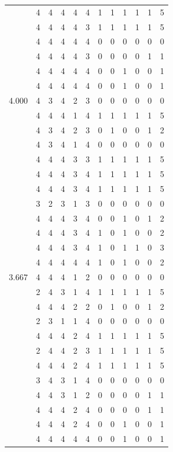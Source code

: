\documentclass[]{book}
\theoremstyle{definition}
\theoremstyle{definition}
\theoremstyle{definition}
\theoremstyle{remark}
\begin{document}
\begin{table}
{\begin{tabular}[t]{rrrrrrrrrrrr}
 & 4 & 4 & 4 & 4 & 4 & 1 & 1 & 1 & 1 & 1 & 5\\
 & 4 & 4 & 4 & 4 & 3 & 1 & 1 & 1 & 1 & 1 & 5\\
 & 4 & 4 & 4 & 4 & 4 & 0 & 0 & 0 & 0 & 0 & 0\\
 & 4 & 4 & 4 & 4 & 3 & 0 & 0 & 0 & 0 & 1 & 1\\
 & 4 & 4 & 4 & 4 & 4 & 0 & 0 & 1 & 0 & 0 & 1\\
 & 4 & 4 & 4 & 4 & 4 & 0 & 0 & 1 & 0 & 0 & 1\\
4.000 & 4 & 3 & 4 & 2 & 3 & 0 & 0 & 0 & 0 & 0 & 0\\
 & 4 & 4 & 4 & 1 & 4 & 1 & 1 & 1 & 1 & 1 & 5\\
 & 4 & 3 & 4 & 2 & 3 & 0 & 1 & 0 & 0 & 1 & 2\\
 & 4 & 3 & 4 & 1 & 4 & 0 & 0 & 0 & 0 & 0 & 0\\
 & 4 & 4 & 4 & 3 & 3 & 1 & 1 & 1 & 1 & 1 & 5\\
 & 4 & 4 & 4 & 3 & 4 & 1 & 1 & 1 & 1 & 1 & 5\\
 & 4 & 4 & 4 & 3 & 4 & 1 & 1 & 1 & 1 & 1 & 5\\
 & 3 & 2 & 3 & 1 & 3 & 0 & 0 & 0 & 0 & 0 & 0\\
 & 4 & 4 & 4 & 3 & 4 & 0 & 0 & 1 & 0 & 1 & 2\\
 & 4 & 4 & 4 & 3 & 4 & 1 & 0 & 1 & 0 & 0 & 2\\
 & 4 & 4 & 4 & 3 & 4 & 1 & 0 & 1 & 1 & 0 & 3\\
 & 4 & 4 & 4 & 4 & 4 & 1 & 0 & 1 & 0 & 0 & 2\\
3.667 & 4 & 4 & 4 & 1 & 2 & 0 & 0 & 0 & 0 & 0 & 0\\
 & 2 & 4 & 3 & 1 & 4 & 1 & 1 & 1 & 1 & 1 & 5\\
 & 4 & 4 & 4 & 2 & 2 & 0 & 1 & 0 & 0 & 1 & 2\\
 & 2 & 3 & 1 & 1 & 4 & 0 & 0 & 0 & 0 & 0 & 0\\
 & 4 & 4 & 4 & 2 & 4 & 1 & 1 & 1 & 1 & 1 & 5\\
 & 2 & 4 & 4 & 2 & 3 & 1 & 1 & 1 & 1 & 1 & 5\\
 & 4 & 4 & 4 & 2 & 4 & 1 & 1 & 1 & 1 & 1 & 5\\
 & 3 & 4 & 3 & 1 & 4 & 0 & 0 & 0 & 0 & 0 & 0\\
 & 4 & 4 & 3 & 1 & 2 & 0 & 0 & 0 & 0 & 1 & 1\\
 & 4 & 4 & 4 & 2 & 4 & 0 & 0 & 0 & 0 & 1 & 1\\
 & 4 & 4 & 4 & 2 & 4 & 0 & 0 & 1 & 0 & 0 & 1\\
 & 4 & 4 & 4 & 4 & 4 & 0 & 0 & 1 & 0 & 0 & 1\\

\end{tabular}}
\end{table}
\end{document}
